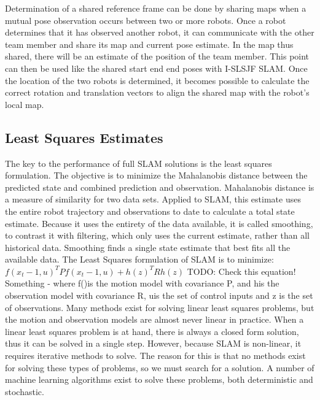\documentclass[12pt]{report}
\begin{document}
Determination of a shared reference frame can be done by sharing maps when a mutual pose observation occurs between two or more robots.  Once a robot determines that it has observed another robot, it can communicate with the other team member and share its map and current pose estimate.  In the map thus shared, there will be an estimate of the position of the team member.  This point can then be used like the shared start end end poses with I-SLSJF SLAM.  Once the location of the two robots is determined, it becomes possible to calculate the correct rotation and translation vectors to align the shared map with the robot's local map.

\subsection{ Least Squares Estimates }

The key to the performance of full SLAM solutions is the least squares formulation.  The objective is to minimize the Mahalanobis distance between the predicted state and combined prediction and observation.  Mahalanobis distance is a measure of similarity for two data sets.  Applied to SLAM, this estimate uses the entire robot trajectory and observations to date to calculate a total state estimate.  Because it uses the entirety of the data available, it is called smoothing, to contrast it with filtering, which only uses the current estimate, rather than all historical data.  Smoothing finds a single state estimate that best fits all the available data.  
	The Least Squares formulation of SLAM is to minimize:
$f(x_t-1,u)^TPf(x_t-1,u) + h(z)^TRh(z) $   TODO: Check this equation! Something -
	where f()is the motion model with covariance P, and his the observation model with covariance R, uis the set of control inputs and z is the set of observations.
 Many methods exist for solving linear least squares problems, but the motion and observation models are almost never linear in practice.  When a linear least squares problem is at hand, there is always a closed form solution, thus it can be solved in a single step.  However, because SLAM is non-linear, it requires iterative methods to solve.  The reason for this is that no methods exist for solving these types of problems, so we must search for a solution.  A number of machine learning algorithms exist to solve these problems, both deterministic and stochastic.
\end{document}
